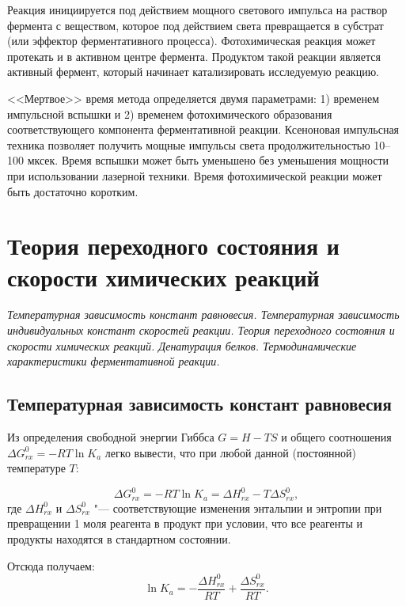 \documentclass[12pt,a4paper,oneside]{book}
\begin{document}
Реакция инициируется под действием мощного светового импульса на раствор фермента с веществом, которое под действием света превращается в субстрат (или эффектор ферментативного процесса). Фотохимическая реакция может протекать и в активном центре фермента. Продуктом такой реакции является активный фермент, который начинает катализировать исследуемую реакцию.

<<Мертвое>> время метода определяется двумя параметрами: 1) временем импульсной вспышки и 2) временем фотохимического образования соответствующего компонента ферментативной реакции. Ксеноновая импульсная техника позволяет получить мощные импульсы света продолжительностью 10--100 мксек. Время вспышки может быть уменьшено без уменьшения мощности при использовании лазерной техники. Время фотохимической реакции может быть достаточно коротким.





\newpage
\section{Теория переходного состояния и скорости химических реакций}
{\it Температурная зависимость констант равновесия. Температурная зависимость индивидуальных констант скоростей реакции. Теория переходного состояния и скорости химических реакций. Денатурация белков. Термодинамические характеристики ферментативной реакции.}

\subsection{Температурная зависимость констант равновесия}

Из определения свободной энергии Гиббса $ G = H -TS $ и общего соотношения $ \Delta G_{rx}^0 = - RT \ln K_a $ легко вывести, что при любой данной (постоянной) температуре $T$:

\begin{equation}
	\Delta G_{rx}^0 = - RT \ln K_a  = \Delta H_{rx}^0 - T \Delta S_{rx}^0,
\end{equation} 
где $\Delta H_{rx}^0$ и $\Delta S_{rx}^0$ "--- соответствующие изменения энтальпии и энтропии при превращении 1 моля реагента в продукт при условии, что все реагенты и продукты находятся в стандартном состоянии.

Отсюда получаем:
\begin{equation}
 \ln K_a = - \dfrac{\Delta H_{rx}^0}{RT} + \dfrac{\Delta S_{rx}^0}{RT}.
\end{equation} 
\end{document}
